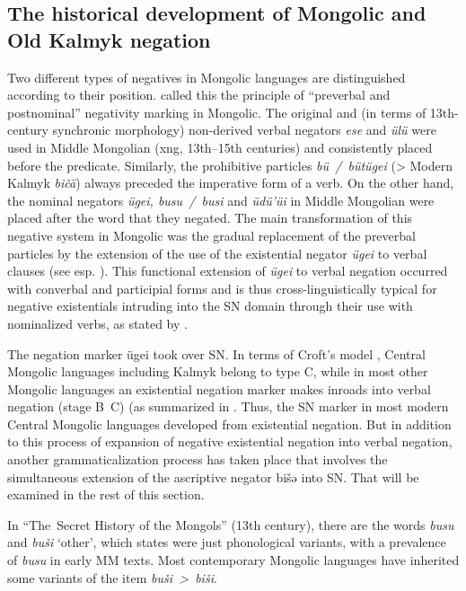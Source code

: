 \documentclass[output=paper]{langsci/langscibook}
\begin{document}
\subsection{The historical development of Mongolic and Old Kalmyk negation}\label{sec:BK3.4}

Two different types of negatives in Mongolic languages are distinguished according to their position. \citet[3]{yu1991a} called this the principle of “preverbal and postnominal” negativity marking in Mongolic. The original and (in terms of 13th-century synchronic morphology) non-derived verbal negators \textit{ese} and \textit{ülü} were used in Middle Mongolian (xng, 13th–15th centuries) and consistently placed before the predicate. Similarly, the prohibitive particles \textit{bü / bütügei} (> Modern Kalmyk \textit{bičä}) always preceded the imperative form of a verb. On the other hand, the nominal negators \textit{ügei, busu / busi} and \textit{üdü’üi} in Middle Mongolian were placed after the word that they negated. The main transformation of this negative system in Mongolic was the gradual replacement of the preverbal particles by the extension of the use of the existential negator \textit{ügei} to verbal clauses (see esp. \citealp{yu1991a, brosig2015a}). This functional extension of \textit{ügei} to verbal negation occurred with converbal and participial forms and is thus cross-linguistically typical for negative existentials intruding into the SN domain through their use with nominalized verbs, as stated by \citet[155]{Veselinova2016}.

The negation marker ügei took over SN. In terms of Croft’s model \citeyearpar{Croft1991}, Central Mongolic languages including Kalmyk belong to type C, while in most other Mongolic languages an existential negation marker makes inroads into verbal negation (stage B~C) (as summarized in \citealp[128]{brosig2015a}. Thus, the SN marker in most modern Central Mongolic languages developed from existential negation. But in addition to this process of expansion of negative existential negation into verbal negation, another grammaticalization process has taken place that involves the simultaneous extension of the ascriptive negator bišǝ into SN. That will be examined in the rest of this section.

In “The Secret History of the Mongols” (13th century), there are the words \textit{busu} and \textit{buši} ‘other’, which \citet[134]{yu1991a} states were just phonological variants, with a prevalence of \textit{busu} in early MM texts. Most contemporary Mongolic languages have inherited some variants of the item \textit{buši > biši}.
\end{document}
